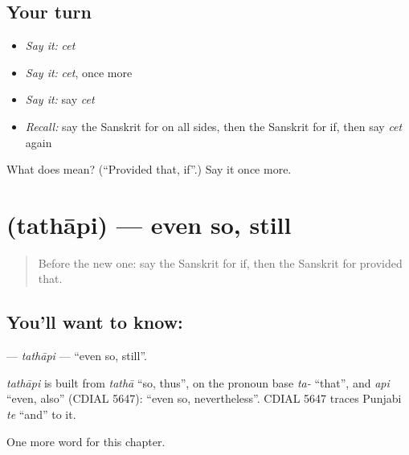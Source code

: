 \subsection*{Your turn}
\begin{itemize}
\raggedright
  \item \emph{Say it:} \emph{cet}
  \item \emph{Say it:} \emph{cet}, once more
  \item \emph{Say it:} say \emph{cet}
  \item \emph{Recall:} say the Sanskrit for on all sides, then the Sanskrit for if, then say \emph{cet} again
\end{itemize}

\begin{tcolorbox}[breakable,colback=teal!4,colframe=teal!35!black,title={Before you move on}]
What does  mean? (\textquotedblleft{}Provided that, if\textquotedblright{}.) Say it once more.
\end{tcolorbox}
\section[\texorpdfstring{\sk{तथापि} (tathāpi)}{तथापि (tathāpi)}]{ (tathāpi) — even so, still}

\label{lesson:SA-C154-tathapi}



\begin{quote}
Before the new one: say the Sanskrit for if, then the Sanskrit for provided that.
\end{quote}

\subsection*{You'll want to know: }
\textbf{} — \emph{tathāpi} — \textquotedblleft{}even so, still\textquotedblright{}.

\begin{cousinweb}
\emph{tathāpi} is built from \emph{tathā} \textquotedblleft{}so, thus\textquotedblright{}, on the pronoun base \emph{ta-} \textquotedblleft{}that\textquotedblright{}, and \emph{api} \textquotedblleft{}even, also\textquotedblright{} (CDIAL 5647): \textquotedblleft{}even so, nevertheless\textquotedblright{}. CDIAL 5647 traces Punjabi \emph{te} \textquotedblleft{}and\textquotedblright{} to it.
\end{cousinweb}

\begin{grammarlens}[title={What you've built}]
One more word for this chapter.
\end{grammarlens}


